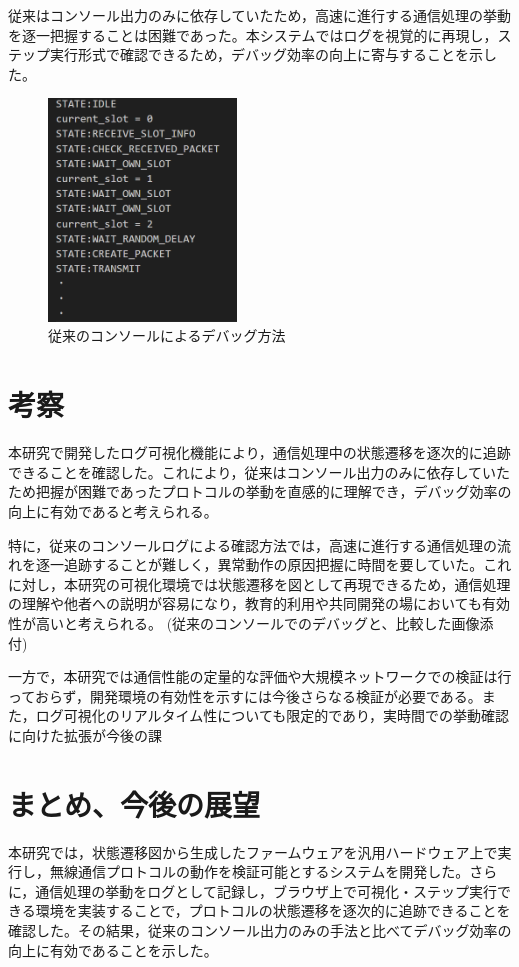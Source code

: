 \documentclass[paper]{ieicej}
\begin{document}
従来はコンソール出力のみに依存していたため，高速に進行する通信処理の挙動を逐一把握することは困難であった。本システムではログを視覚的に再現し，ステップ実行形式で確認できるため，デバッグ効率の向上に寄与することを示した。
\begin{figure}[tb]
  \centering
  \includegraphics[width=50mm]{./images/old_debug.png}
  \caption{従来のコンソールによるデバッグ方法}
  \label{fig:old-debug}
\end{figure}


\section{考察}
本研究で開発したログ可視化機能により，通信処理中の状態遷移を逐次的に追跡できることを確認した。これにより，従来はコンソール出力のみに依存していたため把握が困難であったプロトコルの挙動を直感的に理解でき，デバッグ効率の向上に有効であると考えられる。

特に，従来のコンソールログによる確認方法では，高速に進行する通信処理の流れを逐一追跡することが難しく，異常動作の原因把握に時間を要していた。これに対し，本研究の可視化環境では状態遷移を図として再現できるため，通信処理の理解や他者への説明が容易になり，教育的利用や共同開発の場においても有効性が高いと考えられる。
(従来のコンソールでのデバッグと、比較した画像添付)

一方で，本研究では通信性能の定量的な評価や大規模ネットワークでの検証は行っておらず，開発環境の有効性を示すには今後さらなる検証が必要である。また，ログ可視化のリアルタイム性についても限定的であり，実時間での挙動確認に向けた拡張が今後の課


\section{まとめ、今後の展望}
本研究では，状態遷移図から生成したファームウェアを汎用ハードウェア上で実行し，無線通信プロトコルの動作を検証可能とするシステムを開発した。さらに，通信処理の挙動をログとして記録し，ブラウザ上で可視化・ステップ実行できる環境を実装することで，プロトコルの状態遷移を逐次的に追跡できることを確認した。その結果，従来のコンソール出力のみの手法と比べてデバッグ効率の向上に有効であることを示した。
\end{document}
